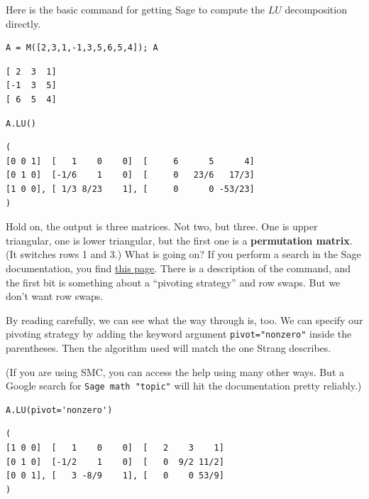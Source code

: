 \documentclass[10pt,]{book}
\newcommand{\terminology}[1]{\textbf{#1}}
\theoremstyle{plain}
\numberwithin{equation}{section}
\begin{document}
        Here is the basic command for getting Sage to compute the \(LU\)
        decomposition directly.
\begin{lstlisting}[style=sageinput]
A = M([2,3,1,-1,3,5,6,5,4]); A
\end{lstlisting}
\begin{lstlisting}[style=sageoutput]
[ 2  3  1]
[-1  3  5]
[ 6  5  4]
\end{lstlisting}
\begin{lstlisting}[style=sageinput]
A.LU()
\end{lstlisting}
\begin{lstlisting}[style=sageoutput]
(
[0 0 1]  [   1    0    0]  [     6      5      4]
[0 1 0]  [-1/6    1    0]  [     0   23/6   17/3]
[1 0 0], [ 1/3 8/23    1], [     0      0 -53/23]
)
\end{lstlisting}
\par

        Hold on, the output is three matrices. Not two, but three. One is upper
        triangular, one is lower triangular, but the first one is a
        \terminology{permutation matrix}. (It switches rows 1 and 3.) What is
        going on? If you perform a search in the Sage documentation, you find
        \href{http://www.sagemath.org/doc/reference/matrices/sage/matrix/matrix2.html}{this page}.
        There is a description of the command, and the first bit is something about
        a ``pivoting strategy'' and row swaps. But we don't want row swaps.
\par

        By reading carefully, we can see what the way through is, too. We can
        specify our pivoting strategy by adding the keyword argument
        \verb?pivot="nonzero"? inside the parentheses. Then the algorithm used
        will match the one Strang describes.
\par
(If you are using SMC, you can access the help using many other ways.
        But a Google search for \verb?Sage math "topic"? will hit the documentation
        pretty reliably.)
\begin{lstlisting}[style=sageinput]
A.LU(pivot='nonzero')
\end{lstlisting}
\begin{lstlisting}[style=sageoutput]
(
[1 0 0]  [   1    0    0]  [   2    3    1]
[0 1 0]  [-1/2    1    0]  [   0  9/2 11/2]
[0 0 1], [   3 -8/9    1], [   0    0 53/9]
)
\end{lstlisting}
\par
\end{document}

